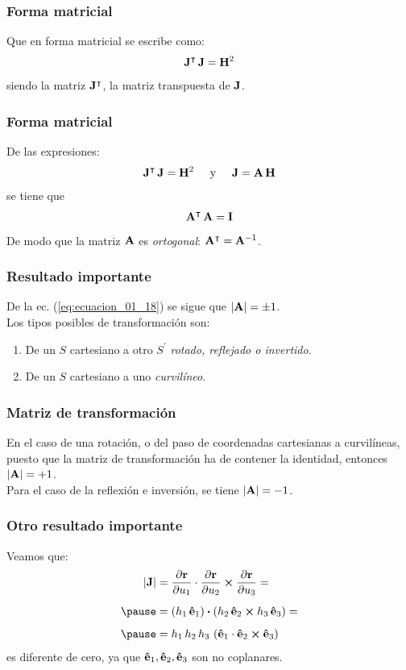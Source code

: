 \documentclass[12pt]{beamer}
\begin{document}
\begin{frame}
\frametitle{Forma matricial}
Que en forma matricial se escribe como:
\pause
\begin{align*}
\vb{J}^{\intercal} \, \vb{J} = \vb{H}^{2}
\end{align*}
siendo la matriz $\vb{J}^{\intercal}$, la matriz transpuesta de $\vb{J}$.
\end{frame}
\begin{frame}
\frametitle{Forma matricial}
De las expresiones:
\pause
\begin{align*}
\vb{J}^{\intercal} \, \vb{J} = \vb{H}^{2} \hspace{0.5cm} \mbox{y} \hspace{0.5cm} \vb{J} = \vb{A} \, \vb{H}
\end{align*}
se tiene que
\begin{align}
\vb{A}^{\intercal} \, \vb{A} = \vb{I}
\label{eq:ecuacion_01_18}
\end{align}
\pause
De modo que la matriz $\vb{A}$ es \emph{ortogonal}: $\vb{A}^{\intercal} = \vb{A}^{-1}$.
\end{frame}
\begin{frame}
\frametitle{Resultado importante}
De la ec. (\ref{eq:ecuacion_01_18}) se sigue que $\abs{\vb{A}} = \pm 1$.
\\
\bigskip
\pause
Los tipos posibles de transformación son:
\begin{enumerate}[<+->]
\item De un $S$ cartesiano a otro $S^{\prime}$ \emph{rotado, reflejado o invertido}.
\item De un $S$ cartesiano a uno \emph{curvilíneo}.
\end{enumerate}
\end{frame}
\begin{frame}
\frametitle{Matriz de transformación}
En el caso de una rotación, o del paso de coordenadas cartesianas a curvilíneas, puesto que la matriz de transformación ha de contener la identidad, entonces $\abs{\vb{A}} = +1$.
\\
\bigskip
\pause
Para el caso de la reflexión e inversión, se tiene $\abs{\vb{A}} = -1$.
\end{frame}
\begin{frame}
\frametitle{Otro resultado importante}
Veamos que:
\pause
\begin{eqnarray*}
\begin{aligned}
\abs{\vb{J}} &= \pdv{\vb{r}}{u_{1}} \cdot \pdv{\vb{r}}{u_{2}} \cp \pdv{\vb{r}}{u_{3}} = \\[0.5em] \pause
&= \left( h_{1} \, \vu{e}_{1} \right) \vdot \left( h_{2} \, \vu{e}_{2} \cp {h_{3} \, \vu{e}_{3}} \right) = \\[0.5em] \pause
&= h_{1} \, h_{2} \, h_{3} \, \left( \vu{e}_{1} \cdot \vu{e}_{2} \cp \vu{e}_{3} \right)
\end{aligned}
\end{eqnarray*}
es diferente de cero, ya que $\vu{e}_{1}, \vu{e}_{2}, \vu{e}_{3}$ son no coplanares.
\end{frame}
\end{document}
